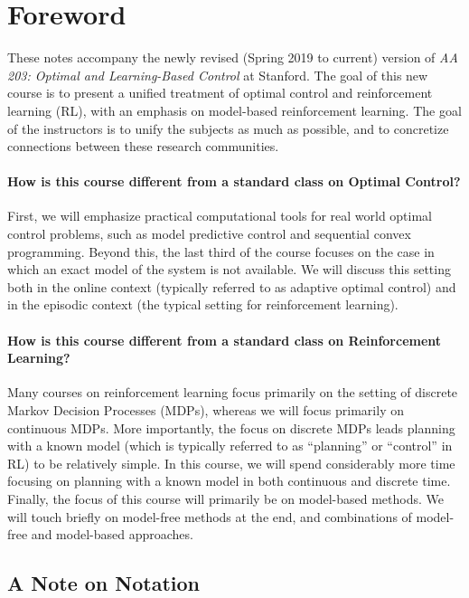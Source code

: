 \section*{Foreword}

These notes accompany the newly revised (Spring 2019 to current) version of \textit{AA 203: Optimal and Learning-Based Control} at Stanford. The goal of this new course is to present a unified treatment of optimal control and reinforcement learning (RL), with an emphasis on model-based reinforcement learning. The goal of the instructors is to unify the subjects as much as possible, and to concretize connections between these research communities. 

\paragraph{How is this course different from a standard class on Optimal Control?} 

First, we will emphasize practical computational tools for real world optimal control problems, such as model predictive control and sequential convex programming. Beyond this, the last third of the course focuses on the case in which an exact model of the system is not available. We will discuss this setting both in the online context (typically referred to as adaptive optimal control) and in the episodic context (the typical setting for reinforcement learning). 

\paragraph{How is this course different from a standard class on Reinforcement Learning?}

Many courses on reinforcement learning focus primarily on the setting of discrete Markov Decision Processes (MDPs), whereas we will focus primarily on continuous MDPs. More importantly, the focus on discrete MDPs leads planning with a known model (which is typically referred to as ``planning'' or ``control'' in RL) to be relatively simple. In this course, we will spend considerably more time focusing on planning with a known model in both continuous and discrete time. Finally, the focus of this course will primarily be on model-based methods. We will touch briefly on model-free methods at the end, and combinations of model-free and model-based approaches. 

\subsection*{A Note on Notation}

